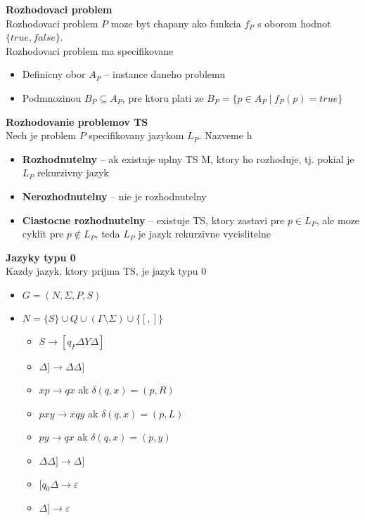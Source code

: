 \documentclass[12pt]{article}
\newcommand{\pipesep}{\hspace{3pt} \vert \hspace{3pt}}
\begin{document}
\textbf{Rozhodovaci problem} \\
Rozhodovaci problem $P$ moze byt chapany ako funkcia $f_{P}$ s oborom hodnot $\{true, false\}$.\\
Rozhodovaci problem ma specifikovane\\
\begin{itemize}
	\item Definicny obor $A_{P}$ -- instance daneho problemu
	\item Podmnozinou $B_{P} \subseteq A_{P}$, pre ktoru plati ze $B_{P} = \{p \in A_{P} \pipesep f_{P}(p) = true\}$
\end{itemize}

\textbf{Rozhodovanie problemov TS}\\
Nech je problem $P$ specifikovany jazykom $L_{P}$. Nazveme h
\begin{itemize}
	\item \textbf{Rozhodnutelny} -- ak existuje uplny TS M, ktory ho rozhoduje, tj. pokial je $L_{P}$ rekurzivny jazyk
	\item \textbf{Nerozhodnutelny} -- nie je rozhodnutelny
	\item \textbf{Ciastocne rozhodnutelny} -- existuje TS, ktory zastavi pre $p \in L_{P}$, ale moze cyklit pre $p \not\in L_{P}$, teda $L_{P}$ je jazyk rekurzivne vycislitelne
\end{itemize}

\textbf{Jazyky typu 0}\\
Kazdy jazyk, ktory prijma TS, je jazyk typu 0
\begin{itemize}
	\item $G = (N,\Sigma,P,S)$
	\item $N = \{S\} \cup Q \cup (\Gamma \setminus \Sigma) \cup \{[,]\}$
	\begin{itemize}
		\item $S \to [q_{F}\Delta Y \Delta]$
		\item $\Delta] \to \Delta\Delta]$
		\item $xp \to qx$ ak $\delta(q,x) = (p,R)$
		\item $pxy \to xqy$ ak $\delta(q,x) = (p,L)$
		\item $py \to qx$ ak $\delta(q,x) = (p,y)$
		\item $\Delta\Delta] \to \Delta]$
		\item $[q_{0}\Delta \to \varepsilon$
		\item $\Delta] \to \varepsilon$
	\end{itemize}
\end{itemize}
\end{document}
